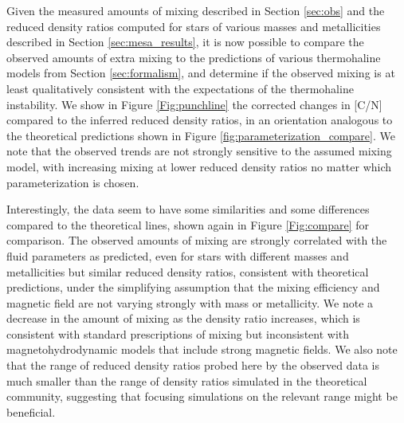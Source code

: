 

Given the measured amounts of mixing described in Section \ref{sec:obs} and the reduced density ratios computed for stars of various masses and metallicities described in Section \ref{sec:mesa_results}, it is now possible to compare the observed amounts of extra mixing to the predictions of various thermohaline models from Section \ref{sec:formalism}, and determine if the observed mixing is at least qualitatively consistent with the expectations of the thermohaline instability. We show in Figure \ref{Fig:punchline} the corrected changes in [C/N] compared to the inferred reduced density ratios, in an orientation analogous to the theoretical predictions shown in Figure \ref{fig:parameterization_compare}. We note that the observed trends are not strongly sensitive to the assumed mixing model, with increasing mixing at lower reduced density ratios no matter which parameterization is chosen. 




Interestingly, the data seem to have some similarities and some differences compared to the theoretical lines, shown again in Figure \ref{Fig:compare} for comparison. The observed amounts of mixing are strongly correlated with the fluid parameters as predicted, even for stars with different masses and metallicities but similar reduced density ratios, consistent with theoretical predictions, under the simplifying assumption that the mixing efficiency and magnetic field are not varying strongly with mass or metallicity. We note a decrease in the amount of mixing as the density ratio increases, which is consistent with standard prescriptions of mixing but inconsistent with magnetohydrodynamic models that include strong magnetic fields. We also note that the range of reduced density ratios probed here by the observed data is much smaller than the range of density ratios simulated in the theoretical community, suggesting that focusing simulations on the relevant range might be beneficial. %


